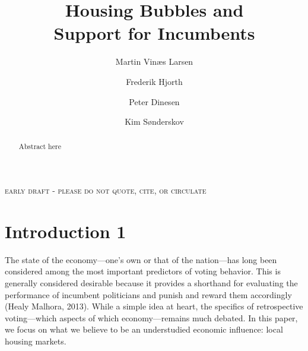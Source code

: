 \documentclass[12pt,a4paper]{article}
\title{\textbf{Housing Bubbles and \\Support for Incumbents}}
\author{
Martin Vinæs Larsen \and Frederik Hjorth \and Peter  Dinesen \and Kim  Sønderskov    }
\begin{document}
\maketitle

\begin{center}
\textsc{early draft - please do not quote, cite, or circulate}
\end{center}

\begin{abstract} Abstract here
\noindent %
 
\end{abstract}



\newpage

\doublespacing

\section{Introduction 1}

The state of the economy—one’s own or that of the nation—has long been considered among the most important predictors of voting behavior. This is generally considered desirable because it provides a shorthand for evaluating the performance of incumbent politicians and punish and reward them accordingly (Healy Malhora, 2013). While a simple idea at heart, the specifics of retrospective voting—which aspects of which economy—remains much debated. In this paper, we focus on what we believe to be an understudied economic influence: local housing markets. 
\end{document}
